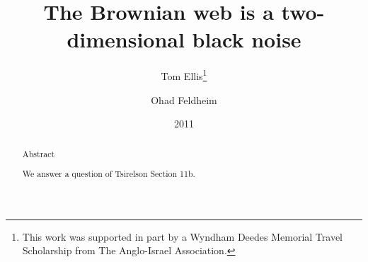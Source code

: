 {
\title{The Brownian web is a two-dimensional black noise}

\newcommand{\tomthanks}{This work was supported in part by
a Wyndham Deedes Memorial Travel Scholarship from The Anglo-Israel
Association.}

\author{Tom Ellis\thanks{\tomthanks}\\%
\and Ohad Feldheim}

\date{2011}

\maketitle

\begin{abstract}
Abstract

We answer a question of
Tsirelson \cite{tsirelson-nonclassical-stochastic-flows} Section 11b.
\end{abstract}

}
